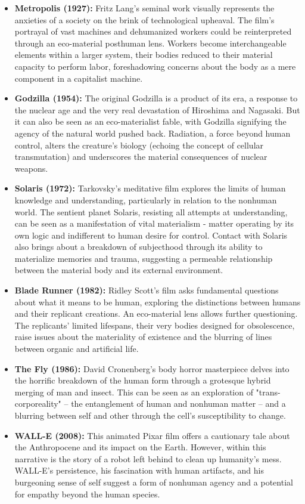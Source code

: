 \documentclass[11pt,fleqn]{book} %
\begin{document}
\begin{itemize}
\item \textbf{Metropolis (1927):} Fritz Lang's seminal work visually represents the anxieties of a society on the brink of technological upheaval. The film's portrayal of vast machines and dehumanized workers could be reinterpreted through an eco-material posthuman lens. Workers become interchangeable elements within a larger system, their bodies reduced to their material capacity to perform labor, foreshadowing concerns about the body as a mere component in a capitalist machine.

\item \textbf{Godzilla (1954):} The original Godzilla is a product of its era, a response to the nuclear age and the very real devastation of Hiroshima and Nagasaki. But it can also be seen as an eco-materialist fable, with Godzilla signifying the agency of the natural world pushed back. Radiation, a force beyond human control, alters the creature's biology (echoing the concept of cellular transmutation) and underscores the material consequences of nuclear weapons.

\item \textbf{Solaris (1972):} Tarkovsky's meditative film explores the limits of human knowledge and understanding, particularly in relation to the nonhuman world. The sentient planet Solaris, resisting all attempts at understanding, can be seen as a manifestation of vital materialism - matter operating by its own logic and indifferent to human desire for control. Contact with Solaris also brings about a breakdown of subjecthood through its ability to materialize memories and trauma, suggesting a permeable relationship between the material body and its external environment.

\item \textbf{Blade Runner (1982):} Ridley Scott's film asks fundamental questions about what it means to be human, exploring the distinctions between humans and their replicant creations. An eco-material lens allows further questioning. The replicants' limited lifespans, their very bodies designed for obsolescence, raise issues about the materiality of existence and the blurring of lines between organic and artificial life.  

\item \textbf{The Fly (1986):}  David Cronenberg's body horror masterpiece delves into the horrific breakdown of the human form through a grotesque hybrid merging of man and insect. This can be seen as an exploration of "trans-corporeality" – the entanglement of human and nonhuman matter – and a blurring between self and other through the cell's susceptibility to change.

\item \textbf{WALL-E (2008):} This animated Pixar film offers a cautionary tale about the Anthropocene and its impact on the Earth. However, within this narrative is the story of a robot left behind to clean up humanity's mess. WALL-E's persistence, his fascination with human artifacts, and his burgeoning sense of self suggest a form of nonhuman agency and a potential for empathy beyond the human species. 
\end{itemize}
\end{document}
